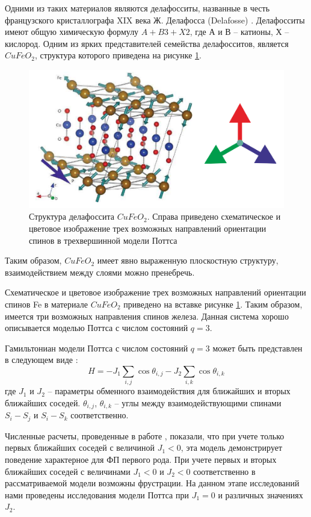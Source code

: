 Одними из таких материалов являются делафосситы, названные в честь французского кристаллографа XIX века Ж. Делафосса  (Delafosse) \cite{ph3_2, ph3_3}. Делафосситы имеют общую химическую формулу $A+B3+X2$, где $А$ и $В$ -- катионы, $Х$ -- кислород. Одним из ярких представителей семейства делафосситов, является $CuFeO_2$, структура которого приведена на рисунке \ref{phys3-pic-47}.

\begin{figure}[H]
	\centering
	\includegraphics[width=0.5\linewidth]{content/sections/images/phys3-1}
	\caption{Структура делафоссита $CuFeO_2$. Справа приведено схематическое и цветовое изображение трех возможных направлений ориентации спинов в трехвершинной  модели Поттса}\label{phys3-pic-47}
\end{figure}





Таким образом, $CuFeO_2$ имеет явно выраженную плоскостную структуру, взаимодействием между слоями можно пренебречь.

Схематическое и цветовое изображение трех возможных направлений ориентации спинов  Fe  в материале $CuFeO_2$  приведено на вставке рисунке \ref{phys3-pic-47}. Таким образом, имеется три возможных направления спинов железа. Данная система хорошо описывается моделью Поттса с числом состояний $q = 3$.

Гамильтониан модели Поттса с числом состояний $q = 3$ может быть представлен в следующем виде \cite{ph3_4}:
\begin{equation}
	H = -J_1 \sum_{i,j}\cos\theta_{i,j}-J_2\sum_{i,k}\cos\theta_{i, k}
\end{equation}
где $J_1$ и $J_2$ -- параметры обменного взаимодействия для ближайших и вторых ближайших соседей. $\theta_{i,j}$, $\theta_{i,k}$ -- углы между взаимодействующими спинами $S_i - S_j$ и $S_i - S_k$ соответственно.

Численные расчеты, проведенные в работе \cite{ph3_4}, показали, что при учете только первых ближайших соседей с величиной $J_1<0$, эта модель демонстрирует поведение характерное для ФП первого рода. При учете первых и вторых ближайших соседей с величинами $J_1<0$ и $J_2<0$ соответственно в рассматриваемой модели возможны фрустрации. На данном этапе исследований нами проведены исследования модели Поттса при $J_1 = 0$ и различных значениях $J_2$.




